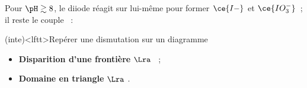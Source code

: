 \documentclass[../../main/main.tex]{subfiles}
\begin{document}
\begin{tcb*}[sidebyside, sidebyside align=top]
  Pour $\pH \gtrsim 8$, le diiode réagit sur lui-même pour former $\ce{I-}$ et
  $\ce{IO_3^-}$~; il reste le couple ~:
	\begin{center}
    \vspace{-15pt}
	\end{center}
\end{tcb*}

\begin{tcb*}(inte)<lftt>{Repérer une dismutation sur un diagramme}
	\begin{itemize}
		\item \textbf{Disparition d'une frontière} $\Lra$ ~;
		\item \textbf{Domaine en triangle} $\Lra$ .
	\end{itemize}
\end{tcb*}
\vspace{-15pt}
\end{document}
